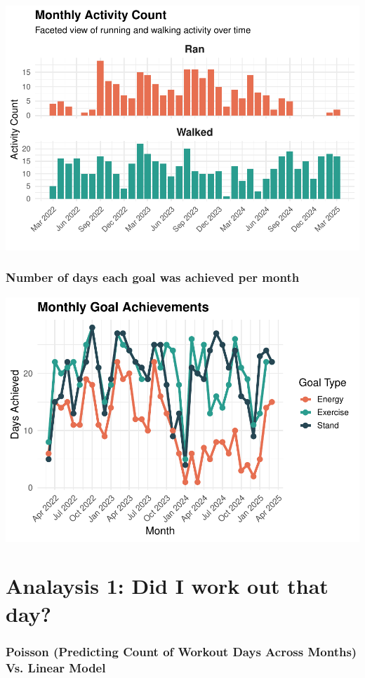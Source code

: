 \documentclass[
  11pt,
]{article}
\begin{document}
\includegraphics{analysis_files/figure-latex/unnamed-chunk-6-1.pdf}

\subsubsection{Number of days each goal was achieved per
month}\label{number-of-days-each-goal-was-achieved-per-month}

\includegraphics{analysis_files/figure-latex/unnamed-chunk-7-1.pdf}

\section{Analaysis 1: Did I work out that
day?}\label{analaysis-1-did-i-work-out-that-day}

\subsubsection{Poisson (Predicting Count of Workout Days Across Months)
Vs. Linear
Model}\label{poisson-predicting-count-of-workout-days-across-months-vs.-linear-model}
\end{document}
